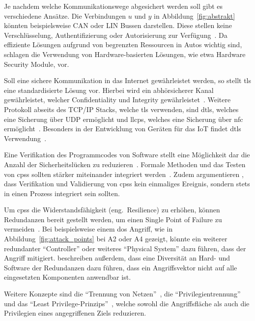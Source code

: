 \documentclass[final,bibliography=totocnumbered]{include/sikseminar}
\newcommand{\cps}{\glspl{cps}\xspace}
\begin{document}
Je nachdem welche Kommunikationswege abgesichert werden soll gibt es verschiedene Ansätze.
Die Verbindungen $u$ und $y$ in Abbildung~\ref{fig:abstrakt} könnten beispielsweise CAN oder LIN Bussen darstellen.
Diese stellen keine Verschlüsselung, Authentifizierung oder Autorisierung zur Verfügung~\cite{HLL+17}.
Da effiziente Lösungen aufgrund von begrenzten Ressourcen in Autos wichtig sind, schlagen \citeauthor{WG12,HUM 41} die Verwendung von Hardware-basierten Lösungen, wie etwa Hardware Security Module, vor.


Soll eine sichere Kommunikation in das Internet gewährleistet werden, so stellt \gls{tls} eine standardisierte Lösung vor.
Hierbei wird ein abhörsicherer Kanal gewährleistet, welcher Confidentiality und Integrity gewährleistet~\cite{SPB+16}.
Weitere Protokoll abseits des TCP/IP Stacks, welche \gls{tls} verwenden, sind \gls{dtls}, welches eine Sicherung über UDP ermöglicht und \gls{llcps}, welches eine Sicherung über \gls{nfc} ermöglicht~\cite{SPB+16}.
Besonders in der Entwicklung von Geräten für das IoT findet \gls{dtls} Verwendung~\cite{YWY+17,FPA+18}.


Eine Verifikation des Programmcodes von Software stellt eine Möglichkeit dar die Anzahl der Sicherheitslücken zu reduzieren~\cite{CAS08}.
Formale Methoden und das Testen von \cps sollten stärker miteinander integriert werden~\cite{RLS+10}.
Zudem argumentieren \citeauthor{SGL+08}, dass Verifikation und Validierung von \cps kein einmaliges Ereignis, sondern stets in einen Prozess integriert sein sollten.


Um \cps die Widerstandsfähigkeit (eng.\ Resilience) zu erhöhen, können Redundanzen bereit gestellt werden, um einen Single Point of Failure zu vermeiden~\cite{CAS+09}.
Bei beispielsweise einem \gls{dos} Angriff, wie in Abbildung~\ref{fig:attack_points} bei A2 oder A4 gezeigt, könnte ein weiterer redundanter \enquote{Controller} oder weiteres \enquote{Physical System} dazu führen, dass der Angriff mitigiert.
\citeauthor{CAS+09} beschreiben außerdem, dass eine Diversität an Hard- und Software der Redundanzen dazu führen, dass ein Angriffsvektor nicht auf alle eingesetzten Komponenten anwendbar ist.


Weitere Konzepte sind die \enquote{Trennung von Netzen}~\cite{GK16}, die \enquote{Privilegientrennung} und das \enquote{Least Privilege-Prinzips}~\cite{CAS+09}, welche sowohl die Angriffsfläche als auch die Privilegien eines angegriffenen Ziels reduzieren.
\end{document}
